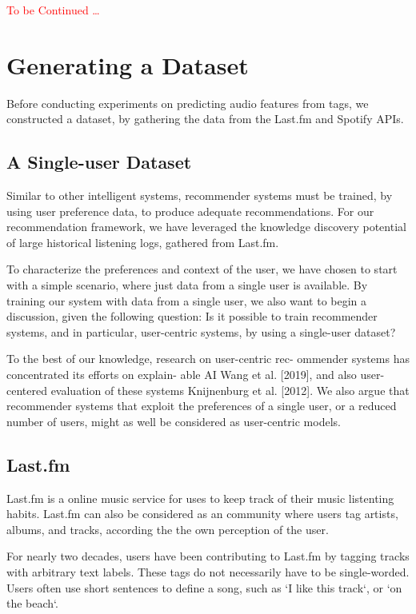 \documentclass[sn-mathphys]{sn-jnl}%
\theoremstyle{thmstyleone}%
\theoremstyle{thmstyletwo}%
\theoremstyle{thmstylethree}%
\begin{document}
\textcolor{red}{To be Continued \dots }




\section{Generating a Dataset}

Before conducting experiments on predicting audio features from tags, we constructed a dataset, by gathering the data from the Last.fm and Spotify APIs.

\subsection{A Single-user Dataset}

Similar to other intelligent systems, recommender systems
must be trained, by using user preference data, to produce
adequate recommendations. For our recommendation framework,
we have leveraged the knowledge discovery potential
of large historical listening logs, gathered from Last.fm.

To characterize the preferences and context of the user, we
have chosen to start with a simple scenario, where just data
from a single user is available. By training our system with
data from a single user, we also want to begin a discussion,
given the following question: Is it possible to train
recommender systems, and in particular, user-centric systems, by
using a single-user dataset?

To the best of our knowledge, research on user-centric rec-
ommender systems has concentrated its efforts on explain-
able AI Wang et al. [2019], and also user-centered evaluation
of these systems Knijnenburg et al. [2012]. We also argue
that recommender systems that exploit the preferences of a
single user, or a reduced number of users, might as well be
considered as user-centric models.


\subsection{Last.fm}

Last.fm is a online music service for uses to keep track of their music listenting habits.
Last.fm can also be considered as an community where users tag artists, albums, and tracks, according the the own perception of the user.

For nearly two decades, users have been contributing to Last.fm by tagging tracks with arbitrary text labels.
These tags do not necessarily have to be single-worded.
Users often use short sentences to define a song, such as `I like this track`, or `on the beach`.
\end{document}
